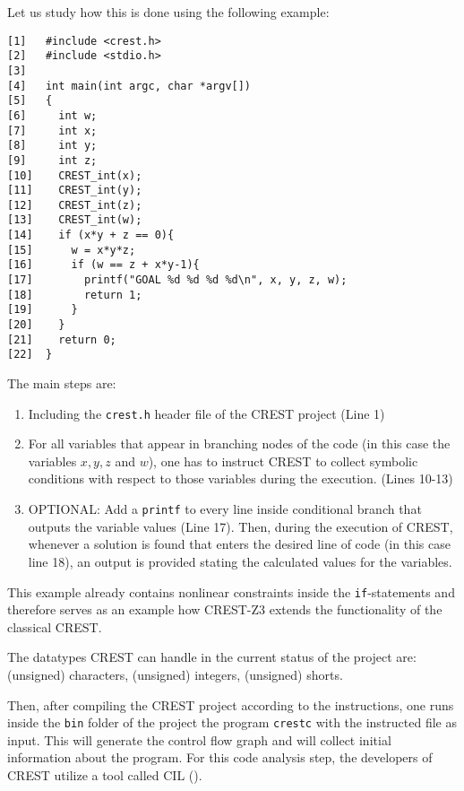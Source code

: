 \documentclass[oribibl]{llncs}
\begin{document}
Let us study how this is done using the following example:

\begin{example}
\label{ex:codeForDemo}
\begin{verbatim}
[1]   #include <crest.h>
[2]   #include <stdio.h>
[3]  
[4]   int main(int argc, char *argv[])
[5]   {
[6]     int w;
[7]     int x;
[8]     int y;
[9]     int z;
[10]    CREST_int(x);
[11]    CREST_int(y);
[12]    CREST_int(z);
[13]    CREST_int(w);
[14]    if (x*y + z == 0){
[15]      w = x*y*z;
[16]      if (w == z + x*y-1){
[17]        printf("GOAL %d %d %d %d\n", x, y, z, w);
[18]        return 1;
[19]      }
[20]    }	
[21]    return 0;
[22]  }
\end{verbatim}
\end{example}

The main steps are:
\begin{enumerate}
  \item Including the \texttt{crest.h} header file of the
    \textsc{CREST} project (Line 1)
   \item For all variables that appear in branching nodes of the code
     (in this case the variables $x,y,z$ and $w$), one has to instruct
     \textsc{CREST} to collect symbolic conditions with respect to
     those variables during the
     execution. (Lines 10-13)
   \item OPTIONAL: Add a
     \texttt{printf} to every line inside conditional branch that
     outputs the variable values (Line 17). Then, during the execution of
     \textsc{CREST}, whenever a solution is found that enters the
     desired line of code (in this case line 18), an output is
     provided stating the calculated values for the variables.
\end{enumerate}

\begin{remark}
  This example already contains nonlinear constraints inside the
  \texttt{if}-statements and therefore serves as an example how
  \textsc{CREST-Z3} extends the functionality of the classical \textsc{CREST}.
\end{remark}

\begin{remark}
  The datatypes \textsc{CREST} can handle in the current status of the
  project are: (unsigned) characters, (unsigned) integers, (unsigned) shorts.
\end{remark}

Then, after compiling the \textsc{CREST} project according to the
instructions, one runs inside the \texttt{bin} folder of the project
the program \texttt{crestc} with the instructed file as input. This
will generate the control flow graph and will collect initial information
about the program. For this code analysis step, the developers of
\textsc{CREST} utilize a tool called \textsc{CIL} (\cite{necula2002cil}).
\end{document}
